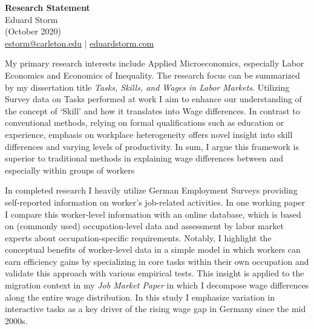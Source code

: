 \documentclass[a4paper,11pt]{article}
\begin{document}
\thispagestyle{plain}

\begin{center}
 {\Large \textbf{Research Statement}} \\
 Eduard Storm \\
 (October 2020) \\
 \href{mailto:estorm@carleton.edu}{estorm@carleton.edu} $|$ \href{https://eduardstorm.com/}{eduardstorm.com}
\end{center}

\noindent

My primary research interests include Applied Microeconomics, especially Labor Economics and Economics of Inequality. The research focus can be summarized by my dissertation title \textit{Tasks, Skills, and Wages in Labor Markets}. Utilizing Survey data on Tasks performed at work I aim to enhance our understanding of the concept of `Skill' and how it translates into Wage differences. In contrast to conventional methods, relying on formal qualifications such as education or experience, emphasis on workplace heterogeneity offers novel insight into skill differences and varying levels of productivity. In sum, I argue this framework is superior to traditional methods in explaining wage differences between and especially within groups of workers


In completed research I heavily utilize German Employment Surveys providing self-reported information on worker's job-related activities. In one working paper I compare this worker-level information with an online database, which is based on (commonly used) occupation-level data and assessment by labor market experts about occupation-specific requirements. Notably, I highlight the conceptual benefits of worker-level data in a simple model in which workers can earn efficiency gains by specializing in core tasks within their own occupation and validate this approach with various empirical tests. This insight is applied to the migration context in my \textit{Job Market Paper} in which I decompose wage differences along the entire wage distribution. In this study I emphasize variation in interactive tasks as a key driver of the rising wage gap in Germany since the mid 2000s. 
\end{document}
